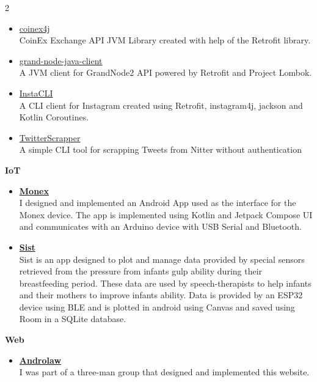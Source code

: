 \begin{multicols}{2}
\begin{description}
\begin{itemize}
            \item \href{https://github.com/yamin8000/coinex4j}{coinex4j}\\
            CoinEx Exchange API JVM Library created with help of the Retrofit library.
            \item \href{https://github.com/TradersTeam/grand-node-java-client}{grand-node-java-client}\\
            A JVM client for GrandNode2 API powered by Retrofit and Project Lombok.
            \item \href{https://github.com/yamin8000/InstaCLI}{InstaCLI}\\
            A CLI client for Instagram created using Retrofit, instagram4j, jackson and Kotlin Coroutines.
            \item \href{https://github.com/yamin8000/TwitterScrapper}{TwitterScrapper}\\
            A simple CLI tool for scrapping Tweets from Nitter without authentication
        \end{itemize}
        \item \textbf{IoT}
        \begin{itemize}
            \item \href{https://hirkaniafaratech.ir/2024-01-04/mehran/252}{\textbf{Monex}}\\
            I designed and implemented an Android App used as the interface for the Monex device.
            The app is implemented using Kotlin and Jetpack Compose UI and communicates with an Arduino device with USB Serial and Bluetooth.
            \item \href{https://klnc.ir/l/xrlo8v8x}{\textbf{Sist}}\\
            Sist is an app designed to plot and manage data provided by special sensors retrieved from the pressure from infants gulp ability during their breastfeeding period.
            These data are used by speech-therapists to help infants and their mothers to improve infants ability.
            Data is provided by an ESP32 device using BLE and is plotted in android using Canvas and saved using Room in a SQLite database.
        \end{itemize}
        \item \textbf{Web}
        \begin {itemize}
            \item \href{https://andro.law}{\textbf{Androlaw}}\\
            I was part of a three-man group that designed and implemented this website.

\end{itemize}
\end{description}
\end{multicols}
